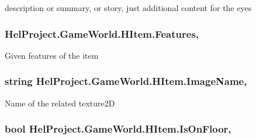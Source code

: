 description or summary, or story, just additional content for the eyes 

\hypertarget{class_hel_project_1_1_game_world_1_1_h_item_a62269e669b1ff06f017424341ffd7cb9}{}
\subsubsection[{Features}]{ Hel\+Project.\+Game\+World.\+H\+Item.\+Features\hspace{0.3cm}{\ttfamily [get]}, {\ttfamily [set]}}\label{class_hel_project_1_1_game_world_1_1_h_item_a62269e669b1ff06f017424341ffd7cb9}


Given features of the item 

\hypertarget{class_hel_project_1_1_game_world_1_1_h_item_a7791b24bb2f3ad7d02ae45054040e9aa}{}
\subsubsection[{Image\+Name}]{\setlength{\rightskip}{0pt plus 5cm}string Hel\+Project.\+Game\+World.\+H\+Item.\+Image\+Name\hspace{0.3cm}{\ttfamily [get]}, {\ttfamily [set]}}\label{class_hel_project_1_1_game_world_1_1_h_item_a7791b24bb2f3ad7d02ae45054040e9aa}


Name of the related texture2\+D 

\hypertarget{class_hel_project_1_1_game_world_1_1_h_item_a5fd0a52b0f490f80d0c7abec4b3293c5}{}
\subsubsection[{Is\+On\+Floor}]{\setlength{\rightskip}{0pt plus 5cm}bool Hel\+Project.\+Game\+World.\+H\+Item.\+Is\+On\+Floor\hspace{0.3cm}{\ttfamily [get]}, {\ttfamily [set]}}\label{class_hel_project_1_1_game_world_1_1_h_item_a5fd0a52b0f490f80d0c7abec4b3293c5}


